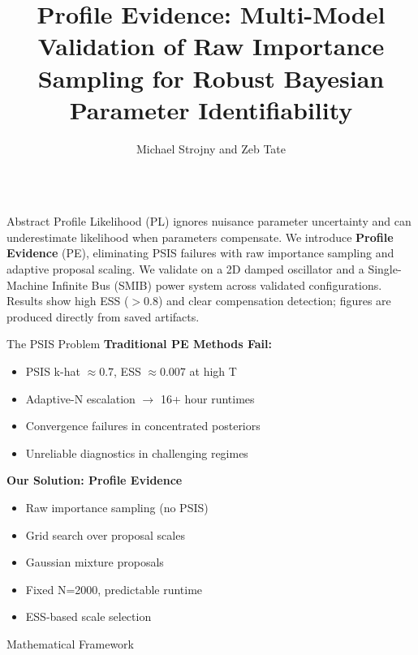 \documentclass[final,hyperref={pdfpagelabels=false}]{beamer}
\title{\Huge \textbf{Profile Evidence: Multi-Model Validation of Raw Importance Sampling for Robust Bayesian Parameter Identifiability}}
\author{\Large Michael Strojny and Zeb Tate}
\institute{\large Department of Electrical and Computer Engineering, University of Toronto}
\date{}
\begin{document}
\begin{frame}[t]
\titlepage

\vspace{-2cm}

\begin{columns}[t,totalwidth=\textwidth]

\begin{column}{0.32\textwidth}

\begin{block}{Abstract}
\small
Profile Likelihood (PL) ignores nuisance parameter uncertainty and can underestimate likelihood when parameters compensate. We introduce \textbf{Profile Evidence} (PE), eliminating PSIS failures with raw importance sampling and adaptive proposal scaling. We validate on a 2D damped oscillator and a Single-Machine Infinite Bus (SMIB) power system across validated configurations. Results show high ESS ($>0.8$) and clear compensation detection; figures are produced directly from saved artifacts.
\end{block}

\begin{alertblock}{The PSIS Problem}
\small
\textbf{Traditional PE Methods Fail:}
\begin{itemize}
\item PSIS k-hat $\approx 0.7$, ESS $\approx 0.007$ at high T
\item Adaptive-N escalation $\rightarrow$ 16+ hour runtimes  
\item Convergence failures in concentrated posteriors
\item Unreliable diagnostics in challenging regimes
\end{itemize}

\vspace{0.3cm}
\textbf{Our Solution: Profile Evidence}
\begin{itemize}
\item Raw importance sampling (no PSIS)
\item Grid search over proposal scales
\item Gaussian mixture proposals  
\item Fixed N=2000, predictable runtime
\item ESS-based scale selection
\end{itemize}
\end{alertblock}

\begin{block}{Mathematical Framework}
\small


\end{block}
\end{column}
\end{columns}
\end{frame}
\end{document}
